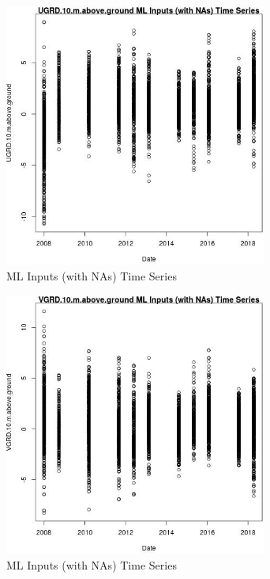 \begin{figure} 
\centering  
\includegraphics[width=0.77\textwidth]{Code_Outputs/Report_ML_input_PM25_Step4_part_e_de_duplicated_aves_compiled_2019-05-18wNAs_UGRD10mabovegroundvDate.jpg} 
\caption{\label{fig:Report_ML_input_PM25_Step4_part_e_de_duplicated_aves_compiled_2019-05-18wNAsUGRD10mabovegroundvDate}ML Inputs (with NAs) Time Series} 
\end{figure} 
 

\begin{figure} 
\centering  
\includegraphics[width=0.77\textwidth]{Code_Outputs/Report_ML_input_PM25_Step4_part_e_de_duplicated_aves_compiled_2019-05-18wNAs_VGRD10mabovegroundvDate.jpg} 
\caption{\label{fig:Report_ML_input_PM25_Step4_part_e_de_duplicated_aves_compiled_2019-05-18wNAsVGRD10mabovegroundvDate}ML Inputs (with NAs) Time Series} 
\end{figure} 
 

